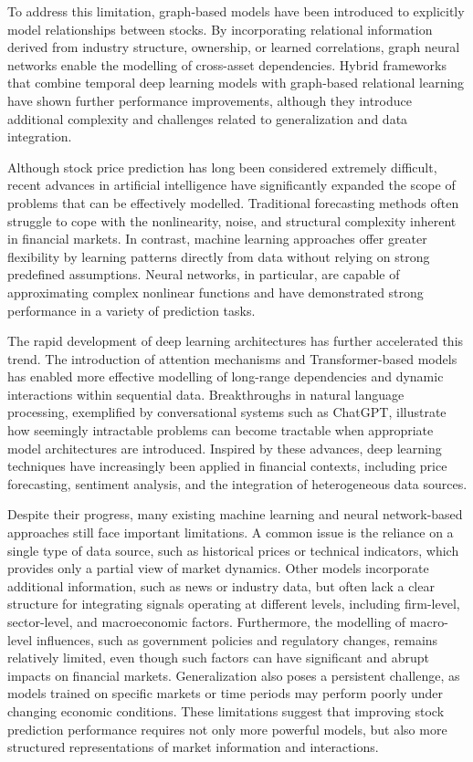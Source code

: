To address this limitation, graph-based models have been introduced to explicitly model relationships between stocks. By incorporating relational information derived from industry structure, ownership, or learned correlations, graph neural networks enable the modelling of cross-asset dependencies. Hybrid frameworks that combine temporal deep learning models with graph-based relational learning have shown further performance improvements, although they introduce additional complexity and challenges related to generalization and data integration.

Although stock price prediction has long been considered extremely difficult, recent advances in artificial intelligence have significantly expanded the scope of problems that can be effectively modelled. Traditional forecasting methods often struggle to cope with the nonlinearity, noise, and structural complexity inherent in financial markets. In contrast, machine learning approaches offer greater flexibility by learning patterns directly from data without relying on strong predefined assumptions. Neural networks, in particular, are capable of approximating complex nonlinear functions and have demonstrated strong performance in a variety of prediction tasks.

The rapid development of deep learning architectures has further accelerated this trend. The introduction of attention mechanisms and Transformer-based models has enabled more effective modelling of long-range dependencies and dynamic interactions within sequential data. Breakthroughs in natural language processing, exemplified by conversational systems such as ChatGPT, illustrate how seemingly intractable problems can become tractable when appropriate model architectures are introduced. Inspired by these advances, deep learning techniques have increasingly been applied in financial contexts, including price forecasting, sentiment analysis, and the integration of heterogeneous data sources.

Despite their progress, many existing machine learning and neural network-based approaches still face important limitations. A common issue is the reliance on a single type of data source, such as historical prices or technical indicators, which provides only a partial view of market dynamics. Other models incorporate additional information, such as news or industry data, but often lack a clear structure for integrating signals operating at different levels, including firm-level, sector-level, and macroeconomic factors.
Furthermore, the modelling of macro-level influences, such as government policies and regulatory changes, remains relatively limited, even though such factors can have significant and abrupt impacts on financial markets. Generalization also poses a persistent challenge, as models trained on specific markets or time periods may perform poorly under changing economic conditions. These limitations suggest that improving stock prediction performance requires not only more powerful models, but also more structured representations of market information and interactions.

